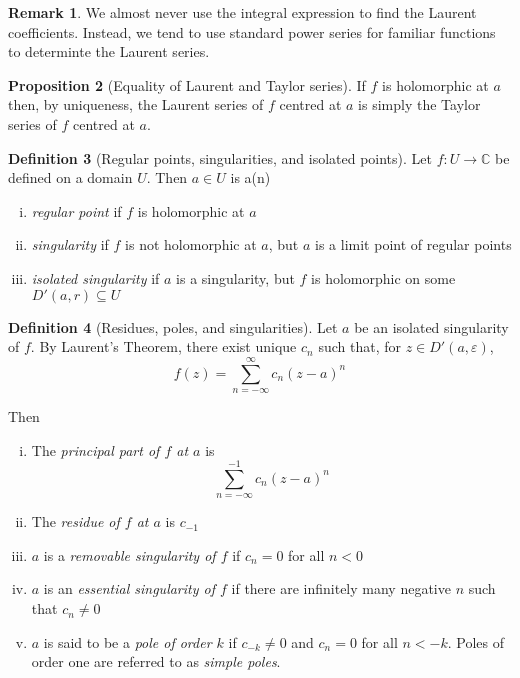 \documentclass[10pt,fleqn]{article}
\newcommand{\comps}{\mathbb{C}}
\newcommand{\eps}{\varepsilon}
\theoremstyle{definition} \newtheorem{defn}{Definition}[section]
\theoremstyle{plain}      \newtheorem{thm}[defn]{Theorem}
\theoremstyle{definition} \newtheorem{prop}[defn]{Proposition}
\theoremstyle{plain}      \newtheorem{lem}[defn]{Lemma}
\theoremstyle{definition} \newtheorem{cor}[defn]{Corollary}
\theoremstyle{definition} \newtheorem{ex}[defn]{Example}
\theoremstyle{definition} \newtheorem{rem}[defn]{Remark}
\begin{document}
\begin{rem}
    We almost never use the integral expression to find the Laurent coefficients.
    Instead, we tend to use standard power series for familiar functions to determinte the Laurent series.
\end{rem}

\begin{prop}[Equality of Laurent and Taylor series]
    If $f$ is holomorphic at $a$ then, by uniqueness, the Laurent series of $f$ centred at $a$ is simply the Taylor series of $f$ centred at $a$.
\end{prop}

\begin{defn}[Regular points, singularities, and isolated points]
    Let $f:U\to\comps$ be defined on a domain $U$.
    Then $a\in U$ is a(n)
    \begin{enumerate}[(i)]
        \item \emph{regular point} if $f$ is holomorphic at $a$
        \item \emph{singularity} if $f$ is not holomorphic at $a$, but $a$ is a limit point of regular points
        \item \emph{isolated singularity} if $a$ is a singularity, but $f$ is holomorphic on some $D'(a,r)\subseteq U$
    \end{enumerate}
\end{defn}

\begin{defn}[Residues, poles, and singularities]
    Let $a$ be an isolated singularity of $f$.
    By Laurent's Theorem, there exist unique $c_n$ such that, for $z\in D'(a,\eps)$,
    \[
        f(z)=
        \sum_{n=-\infty}^{\infty}c_n(z-a)^n
    \]

    Then
    \begin{enumerate}[(i)]
        \item The \emph{principal part of $f$ at $a$} is
        \[
            \sum_{n=-\infty}^{-1}c_n(z-a)^n
        \]
        \item The \emph{residue of $f$ at $a$} is $c_{-1}$
        \item $a$ is a \emph{removable singularity of $f$} if $c_n=0$ for all $n<0$
        \item $a$ is an \emph{essential singularity of $f$} if there are infinitely many negative $n$ such that $c_n\neq0$
        \item $a$ is said to be a \emph{pole of order $k$} if $c_{-k}\neq0$ and $c_n=0$ for all $n<-k$.
        Poles of order one are referred to as \emph{simple poles}.
    \end{enumerate}
\end{defn}
\end{document}
